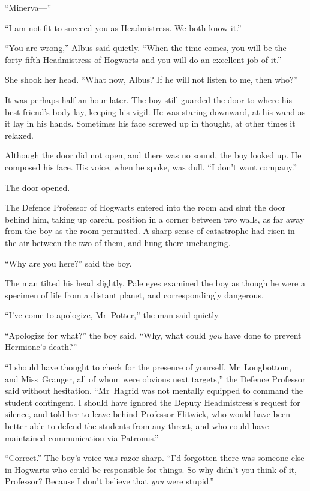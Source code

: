 “Minerva—”

“I am not fit to succeed you as Headmistress. We both know it.”

“You are wrong,” Albus said quietly. “When the time comes, you will be the forty-fifth Headmistress of Hogwarts and you will do an excellent job of it.”

She shook her head. “What now, Albus? If he will not listen to me, then who?”

\later

It was perhaps half an hour later. The boy still guarded the door to where his best friend’s body lay, keeping his vigil. He was staring downward, at his wand as it lay in his hands. Sometimes his face screwed up in thought, at other times it relaxed.

Although the door did not open, and there was no sound, the boy looked up. He composed his face. His voice, when he spoke, was dull. “I don’t want company.”

The door opened.

The Defence Professor of Hogwarts entered into the room and shut the door behind him, taking up careful position in a corner between two walls, as far away from the boy as the room permitted. A sharp sense of catastrophe had risen in the air between the two of them, and hung there unchanging.

“Why are you here?” said the boy.

The man tilted his head slightly. Pale eyes examined the boy as though he were a specimen of life from a distant planet, and correspondingly dangerous.

“I’ve come to apologize, Mr~Potter,” the man said quietly.

“Apologize for what?” the boy said. “Why, what could \emph{you} have done to prevent Hermione’s death?”

“I should have thought to check for the presence of yourself, Mr~Longbottom, and Miss~Granger, all of whom were obvious next targets,” the Defence Professor said without hesitation. “Mr~Hagrid was not mentally equipped to command the student contingent. I should have ignored the Deputy Headmistress’s request for silence, and told her to leave behind Professor Flitwick, who would have been better able to defend the students from any threat, and who could have maintained communication via Patronus.”

“Correct.” The boy’s voice was razor-sharp. “I’d forgotten there was someone else in Hogwarts who could be responsible for things. So why didn’t you think of it, Professor? Because I don’t believe that \emph{you} were stupid.”

